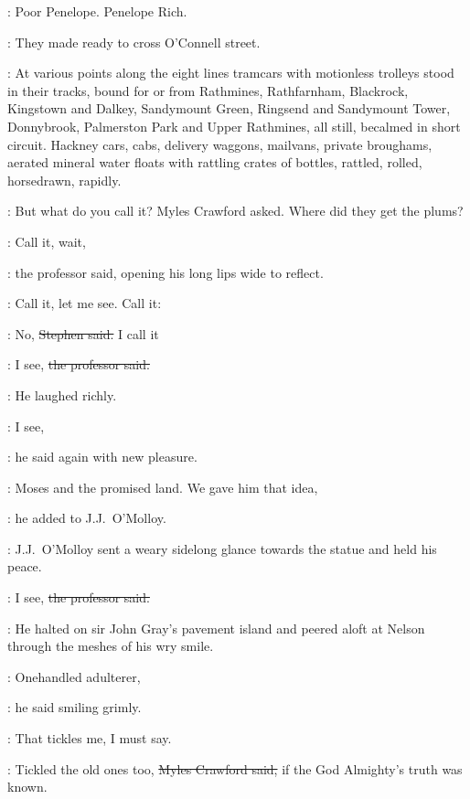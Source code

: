 \StephenInt:
Poor Penelope.
Penelope Rich.

:
They made ready to cross O'Connell street.



:
At various points along the eight lines
tramcars with motionless trolleys stood in their tracks,
bound for or from
Rathmines,
Rathfarnham,
Blackrock,
Kingstown and Dalkey,
Sandymount Green,
Ringsend and
Sandymount Tower,
Donnybrook,
Palmerston Park and Upper Rathmines,
all still,
becalmed in short circuit.
Hackney cars,
cabs,
delivery
waggons,
mailvans,
private broughams,
aerated mineral water floats with rattling crates of bottles,
rattled,
rolled,
horsedrawn,
rapidly.




\crawford:
But what do you call it?
Myles Crawford asked.
Where did they get the plums?



\machugh:
Call it, wait,

:
the professor said,
opening his long lips wide to
reflect.

\machugh:
Call it,
let me see.
Call it:

\Stephen:
No,
\sout{Stephen said.}
I call it

\machugh:
I see,
\sout{the professor said.}


:
He laughed richly.

\machugh:
I see,

:
he said again with new pleasure.

\machugh:
Moses and the promised land.
We gave him that idea,

:
he added to J.J.~O'Molloy.



:
J.J.~O'Molloy sent a weary sidelong glance towards the statue
and held his peace.

\machugh:
I see,
\sout{the professor said.}

:
He halted on sir John Gray's pavement island
and peered aloft at Nelson through the meshes of his wry smile.



\machugh:
Onehandled adulterer,

:
he said smiling grimly.

\machugh:
That tickles me, I must say.

\crawford:
Tickled the old ones too,
\sout{Myles Crawford said,}
if the God Almighty's truth was known.


